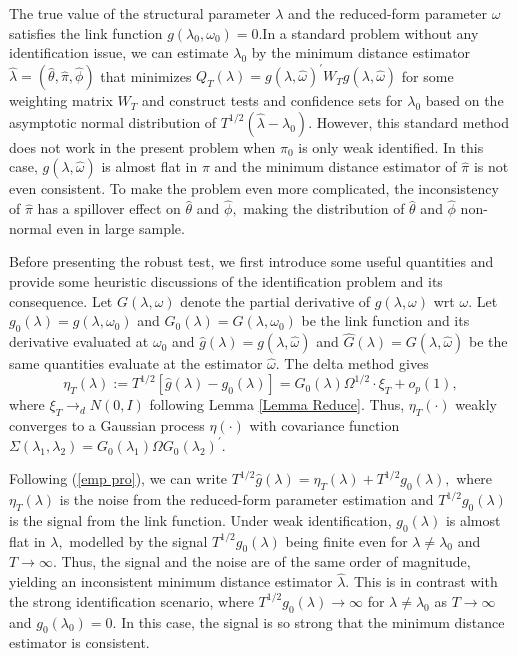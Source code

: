 \documentclass[11pt, letterpaper, twoside]{article}
\begin{document}
The true value of the structural parameter $\lambda $ and the reduced-form
parameter $\omega $ satisfies the link function $g(\lambda _{0},\omega
_{0})=0.$In a standard problem without any identification issue, we can
estimate $\lambda _{0}$ by the minimum distance estimator $\widehat{\lambda }%
=(\widehat{\theta },\widehat{\pi },\widehat{\phi })$ that minimizes $%
Q_{T}(\lambda )=g(\lambda ,\widehat{\omega })^{\prime }W_{T}g(\lambda ,%
\widehat{\omega })$ for some weighting matrix $W_{T}$ and construct tests
and confidence sets for $\lambda _{0}$ based on the asymptotic normal
distribution of $T^{1/2}(\widehat{\lambda }-\lambda _{0})$. However, this
standard method does not work in the present problem when $\pi _{0}$ is only
weak identified. In this case, $g(\lambda ,\widehat{\omega })$ is almost
flat in $\pi $ and the minimum distance estimator of $\widehat{\pi }$ is not
even consistent. To make the problem even more complicated, the
inconsistency of $\widehat{\pi }$ has a spillover effect on $\widehat{\theta 
}$ and $\widehat{\phi },$ making the distribution of $\widehat{\theta }$ and 
$\widehat{\phi }$ non-normal even in large sample.

Before presenting the robust test, we first introduce some useful quantities
and provide some heuristic discussions of the identification problem and its
consequence. Let $G(\lambda ,\omega )$ denote the partial derivative of $%
g(\lambda ,\omega )$ wrt $\omega .$ Let $g_{0}(\lambda )=g(\lambda ,\omega
_{0})$ and $G_{0}(\lambda )=G(\lambda ,\omega _{0})$ be the link function
and its derivative evaluated at $\omega _{0}$ and $\widehat{g}(\lambda
)=g(\lambda ,\widehat{\omega })$ and $\widehat{G}(\lambda )=G(\lambda ,%
\widehat{\omega })$ be the same quantities evaluate at the estimator $%
\widehat{\omega }.$ The delta method gives 
\begin{equation}
\eta _{T}(\lambda ):=T^{1/2}\left[ \widehat{g}(\lambda )-g_{0}(\lambda )%
\right] =G_{0}(\lambda )\Omega ^{1/2}\cdot \xi _{T}+o_{p}(1),
\label{emp pro}
\end{equation}%
where $\xi _{T}\rightarrow _{d}N(0,I)$ following Lemma \ref{Lemma Reduce}.
Thus, $\eta _{T}(\cdot )$ weakly converges to a Gaussian process $\eta
(\cdot )$ with covariance function $\Sigma (\lambda _{1},\lambda
_{2})=G_{0}(\lambda _{1})\Omega G_{0}(\lambda _{2})^{\prime }.$

Following (\ref{emp pro}), we can write $T^{1/2}\widehat{g}(\lambda )=\eta
_{T}(\lambda )+T^{1/2}g_{0}(\lambda ),$ where $\eta _{T}(\lambda )$ is the
noise from the reduced-form parameter estimation and $T^{1/2}g_{0}(\lambda )$
is the signal from the link function. Under weak identification, $%
g_{0}(\lambda )$ is almost flat in $\lambda ,$ modelled by the signal $%
T^{1/2}g_{0}(\lambda )$ being finite even for $\lambda \neq \lambda _{0}$
and $T\rightarrow \infty .$ Thus, the signal and the noise are of the same
order of magnitude, yielding an inconsistent minimum distance estimator $%
\widehat{\lambda }.$ This is in contrast with the strong identification
scenario, where $T^{1/2}g_{0}(\lambda )\rightarrow \infty $ for $\lambda
\neq \lambda _{0}$ as $T\rightarrow \infty $ and $g_{0}(\lambda _{0})=0.$ In
this case, the signal is so strong that the minimum distance estimator is
consistent.
\end{document}
